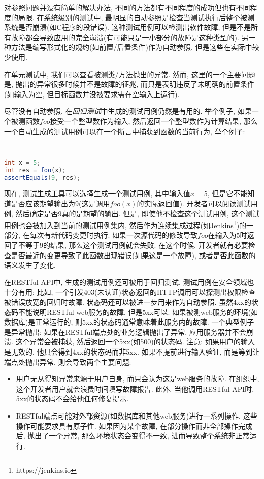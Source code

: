   对参照问题并没有简单的解决办法, 不同的方法都有不同程度的成功但也有不同程度的局限\cite{barr2015oracle}. 在系统级别的测试中, 最明显的自动参照是检查当测试执行后整个被测系统是否崩溃(如C程序的段错误). 这种测试用例可以检测出软件故障, 但是不是所有故障都会导致应用的完全崩溃(有可能只是一小部分的故障是这种类型的). 另一种方法是编写形式化的规约(如前置/后置条件)作为自动参照, 但是这些在实际中较少使用. 
        
  在单元测试中, 我们可以查看被测类/方法抛出的异常\cite{fraser20151600}. 然而, 这里的一个主要问题是, 抛出的异常很多时候并不是故障的征兆, 而只是表明违反了未明确的前置条件(如输入为空, 但目标函数并没被要求需在空输入上运行). 
        
  尽管没有自动参照, 在\textit{回归测试}中生成的测试用例仍然是有用的. 举个例子, 如果一个被测函数$foo$接受一个整型数作为输入, 然后返回一个整型数作为计算结果, 那么一个自动生成的测试用例可以在一个断言中捕获到函数的当前行为, 举个例子: 
        
    {
        \tt
        \small
        \begin{lstlisting}[language=java]
int x = 5;
int res = foo(x);
assertEquals(9, res);
    \end{lstlisting}
    }
        
    现在, 测试生成工具可以选择生成一个测试用例, 其中输入值$x = 5$, 但是它不能知道是否应该期望输出为9(这是调用$foo(x)$的实际返回值). 开发者可以阅读测试用例, 然后确定是否9真的是期望的输出. 但是, 即使他不检查这个测试用例, 这个测试用例也会被加入到当前的测试用例集内, 然后作为连续集成过程(如Jenkins\footnote{https://jenkins.io})的一部分, 在每次有新代码变更时执行. 如果一次源代码的修改导致$foo$在输入为5时返回了不等于9的结果, 那么这个测试用例就会失败. 在这个时候, 开发者就有必要检查是否最近的变更导致了此函数出现错误(如果这是一个故障), 或者是否此函数的语义发生了变化.
        
    在RESTful API中, 生成的测试用例还可被用于回归测试. 测试用例在安全领域也十分有用: 比如, 一个引发403(未认证)状态返回的HTTP调用可以探测出权限检查被错误放宽的回归时故障. 状态码还可以被进一步用来作为自动参照. 虽然4xx的状态码不能说明RESTful web服务的故障, 但是5xx可以. 如果被测web服务的环境(如数据库)是正常运行的, 则5xx的状态码通常意味着此服务内的故障. 一个典型例子是异常抛出: 如果在RESTful端点处的业务逻辑抛出了异常, 应用服务器并不会崩溃. 这个异常会被捕获, 然后返回一个5xx(如500)的状态码. 注意: 如果用户的输入是无效的, 他只会得到4xx的状态码而非5xx. 如果不提前进行输入验证, 而是等到让端点处抛出异常, 则会导致两个主要问题: 
    \begin{itemize}
    \item 用户无从得知异常来源于用户自身, 而只会认为这是web服务的故障. 在组织中, 这个开发者用户就会浪费时间填写故障报告. 此外, 当他调用RESTful API时, 5xx的状态码不会给他任何修复提示. 
        
      \item RESTful端点可能对外部资源(如数据库和其他web服务)进行一系列操作, 这些操作可能要求具有原子性. 如果因为某个故障, 在部分操作而非全部操作完成后, 抛出了一个异常, 那么环境状态会变得不一致, 进而导致整个系统非正常运行.
  \end{itemize}
    
